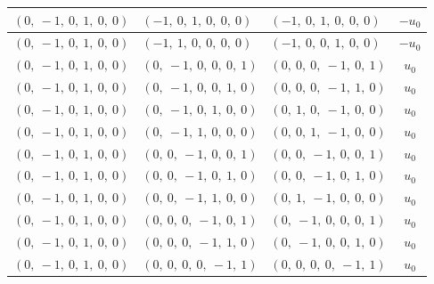 \documentclass[11pt]{article}
\theoremstyle{definition}
\begin{document}
\begin{longtable}{|l|l|l|c|}
    \hline
    $\left( 0, \  -1, \  0, \  1, \  0, \  0\right)$ & $\left( -1, \  0, \  1, \  0, \  0, \  0\right)$ & $\left( -1, \  0, \  1, \  0, \  0, \  0\right)$ & $- u_{0}$ \\
    \hline
    $\left( 0, \  -1, \  0, \  1, \  0, \  0\right)$ & $\left( -1, \  1, \  0, \  0, \  0, \  0\right)$ & $\left( -1, \  0, \  0, \  1, \  0, \  0\right)$ & $- u_{0}$ \\
    \hline
    $\left( 0, \  -1, \  0, \  1, \  0, \  0\right)$ & $\left( 0, \  -1, \  0, \  0, \  0, \  1\right)$ & $\left( 0, \  0, \  0, \  -1, \  0, \  1\right)$ & $u_{0}$ \\
    \hline
    $\left( 0, \  -1, \  0, \  1, \  0, \  0\right)$ & $\left( 0, \  -1, \  0, \  0, \  1, \  0\right)$ & $\left( 0, \  0, \  0, \  -1, \  1, \  0\right)$ & $u_{0}$ \\
    \hline
    $\left( 0, \  -1, \  0, \  1, \  0, \  0\right)$ & $\left( 0, \  -1, \  0, \  1, \  0, \  0\right)$ & $\left( 0, \  1, \  0, \  -1, \  0, \  0\right)$ & $u_{0}$ \\
    \hline
    $\left( 0, \  -1, \  0, \  1, \  0, \  0\right)$ & $\left( 0, \  -1, \  1, \  0, \  0, \  0\right)$ & $\left( 0, \  0, \  1, \  -1, \  0, \  0\right)$ & $u_{0}$ \\
    \hline
    $\left( 0, \  -1, \  0, \  1, \  0, \  0\right)$ & $\left( 0, \  0, \  -1, \  0, \  0, \  1\right)$ & $\left( 0, \  0, \  -1, \  0, \  0, \  1\right)$ & $u_{0}$ \\
    \hline
    $\left( 0, \  -1, \  0, \  1, \  0, \  0\right)$ & $\left( 0, \  0, \  -1, \  0, \  1, \  0\right)$ & $\left( 0, \  0, \  -1, \  0, \  1, \  0\right)$ & $u_{0}$ \\
    \hline
    $\left( 0, \  -1, \  0, \  1, \  0, \  0\right)$ & $\left( 0, \  0, \  -1, \  1, \  0, \  0\right)$ & $\left( 0, \  1, \  -1, \  0, \  0, \  0\right)$ & $u_{0}$ \\
    \hline
    $\left( 0, \  -1, \  0, \  1, \  0, \  0\right)$ & $\left( 0, \  0, \  0, \  -1, \  0, \  1\right)$ & $\left( 0, \  -1, \  0, \  0, \  0, \  1\right)$ & $u_{0}$ \\
    \hline
    $\left( 0, \  -1, \  0, \  1, \  0, \  0\right)$ & $\left( 0, \  0, \  0, \  -1, \  1, \  0\right)$ & $\left( 0, \  -1, \  0, \  0, \  1, \  0\right)$ & $u_{0}$ \\
    \hline
    $\left( 0, \  -1, \  0, \  1, \  0, \  0\right)$ & $\left( 0, \  0, \  0, \  0, \  -1, \  1\right)$ & $\left( 0, \  0, \  0, \  0, \  -1, \  1\right)$ & $u_{0}$ \\

\end{longtable}
\end{document}
